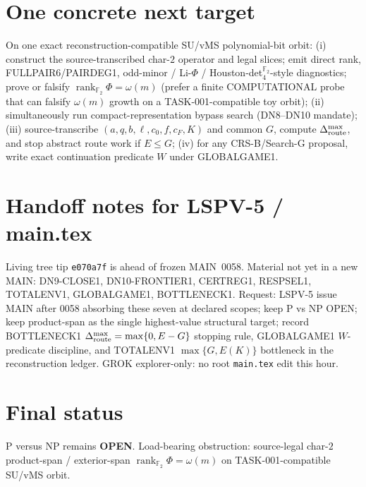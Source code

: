 \documentclass[11pt]{article}
\begin{document}
\section*{One concrete next target}
On one exact reconstruction-compatible SU/vMS polynomial-bit orbit: (i) construct
the source-transcribed char-$2$ operator and legal slices; emit direct rank,
FULLPAIR6/PAIRDEG1, odd-minor / Li-$\Phi$ / Houston-det$_4^{\mathbb F_2}$-style
diagnostics; prove or falsify $\boxed{\operatorname{rank}_{\mathbb F_2}\Phi=\omega(m)}$
(prefer a finite COMPUTATIONAL probe that can falsify $\omega(m)$ growth on a
TASK-001-compatible toy orbit); (ii) simultaneously run compact-representation
bypass search (DN8--DN10 mandate); (iii) source-transcribe
$(a,q,b,\ell,c_0,f,c_F,K)$ and common $G$, compute $\Delta_{\rm route}^{\max}$,
and stop abstract route work if $E\le G$; (iv) for any CRS-B/Search-G proposal,
write exact continuation predicate $W$ under GLOBALGAME1.

\section*{Handoff notes for LSPV-5 / main.tex}
Living tree tip \texttt{e070a7f} is ahead of frozen MAIN~0058. Material not yet
in a new MAIN: DN9-CLOSE1, DN10-FRONTIER1, CERTREG1, RESPSEL1, TOTALENV1,
GLOBALGAME1, BOTTLENECK1. Request: LSPV-5 issue MAIN after 0058 absorbing these
seven at declared scopes; keep P vs NP OPEN; keep product-span as the single
highest-value structural target; record BOTTLENECK1
$\Delta_{\rm route}^{\max}=\max\{0,E-G\}$ stopping rule, GLOBALGAME1
$W$-predicate discipline, and TOTALENV1 $\max\{G,E(K)\}$ bottleneck in the
reconstruction ledger. GROK explorer-only: no root \texttt{main.tex} edit this
hour.

\section*{Final status}
P versus NP remains \textbf{OPEN}.
Load-bearing obstruction: source-legal char-$2$ product-span / exterior-span
$\operatorname{rank}_{\mathbb F_2}\Phi=\omega(m)$ on TASK-001-compatible SU/vMS
orbit.

\end{document}
